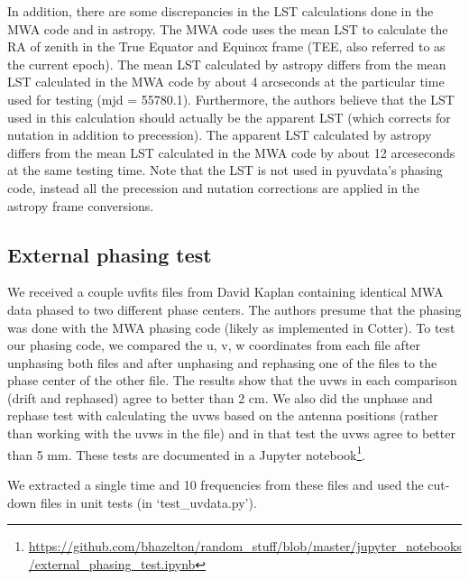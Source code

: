 \documentclass[11pt, oneside]{article}   	%
\begin{document}
In addition, there are some discrepancies in the LST calculations done in the MWA code and in astropy. The MWA code uses the mean LST to calculate the RA of zenith in the True Equator and Equinox frame (TEE, also referred to as the current epoch). The mean LST calculated by astropy differs from the mean LST calculated in the MWA code by about 4 arcseconds at the particular time used for testing (mjd = 55780.1). Furthermore, the authors believe that the LST used in this calculation should actually be the apparent LST (which corrects for nutation in addition to precession). The apparent LST calculated by astropy differs from the mean LST calculated in the MWA code by about 12 arceseconds at the same testing time. Note that the LST is not used in pyuvdata's phasing code, instead all the precession and nutation corrections are applied in the astropy frame conversions.

\subsection{External phasing test}
We received a couple uvfits files from David Kaplan containing identical MWA data phased to two different phase centers. The authors presume that the phasing was done with the MWA phasing code (likely as implemented in Cotter). To test our phasing code, we compared the u, v, w coordinates from each file after unphasing both files and after unphasing and rephasing one of the files to the phase center of the other file. The results show that the uvws in each comparison (drift and rephased) agree to better than 2 cm. We also did the unphase and rephase test with calculating the uvws based on the antenna positions (rather than working with the uvws in the file) and in that test the uvws agree to better than 5 mm. These tests are documented in a Jupyter notebook\footnote{\url{https://github.com/bhazelton/random_stuff/blob/master/jupyter_notebooks/external_phasing_test.ipynb}}.

We extracted a single time and 10 frequencies from these files and used the cut-down files in unit tests (in `test\_uvdata.py').
\end{document}
